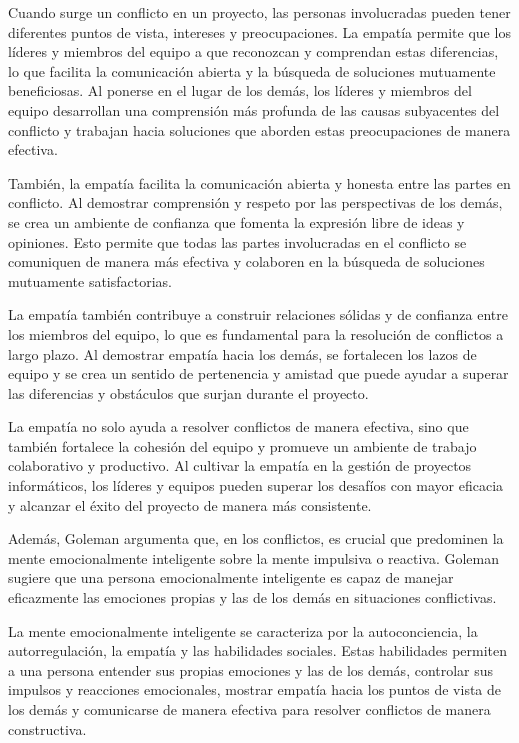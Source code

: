 \documentclass[journal]{IEEEtran}
\begin{document}
Cuando surge un conflicto en un proyecto, las personas involucradas pueden tener diferentes puntos de vista, intereses y preocupaciones. La empatía permite que los líderes y miembros del equipo a que reconozcan y comprendan estas diferencias, lo que facilita la comunicación abierta y la búsqueda de soluciones mutuamente beneficiosas. Al ponerse en el lugar de los demás, los líderes y miembros del equipo desarrollan una comprensión más profunda de las causas subyacentes del conflicto y trabajan hacia soluciones que aborden estas preocupaciones de manera efectiva.

También, la empatía facilita la comunicación abierta y honesta entre las partes en conflicto. Al demostrar comprensión y respeto por las perspectivas de los demás, se crea un ambiente de confianza que fomenta la expresión libre de ideas y opiniones. Esto permite que todas las partes involucradas en el conflicto se comuniquen de manera más efectiva y colaboren en la búsqueda de soluciones mutuamente satisfactorias.

La empatía también contribuye a construir relaciones sólidas y de confianza entre los miembros del equipo, lo que es fundamental para la resolución de conflictos a largo plazo. Al demostrar empatía hacia los demás, se fortalecen los lazos de equipo y se crea un sentido de pertenencia y amistad que puede ayudar a superar las diferencias y obstáculos que surjan durante el proyecto.

La empatía no solo ayuda a resolver conflictos de manera efectiva, sino que también fortalece la cohesión del equipo y promueve un ambiente de trabajo colaborativo y productivo. Al cultivar la empatía en la gestión de proyectos informáticos, los líderes y equipos pueden superar los desafíos con mayor eficacia y alcanzar el éxito del proyecto de manera más consistente.

Además, Goleman argumenta que, en los conflictos, es crucial que predominen la mente emocionalmente inteligente sobre la mente impulsiva o reactiva. Goleman sugiere que una persona emocionalmente inteligente es capaz de manejar eficazmente las emociones propias y las de los demás en situaciones conflictivas.

La mente emocionalmente inteligente se caracteriza por la autoconciencia, la autorregulación, la empatía y las habilidades sociales. Estas habilidades permiten a una persona entender sus propias emociones y las de los demás, controlar sus impulsos y reacciones emocionales, mostrar empatía hacia los puntos de vista de los demás y comunicarse de manera efectiva para resolver conflictos de manera constructiva.
\end{document}
